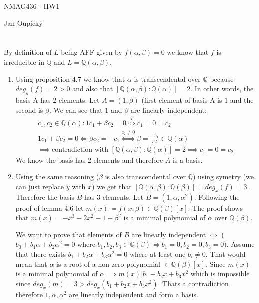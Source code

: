 \documentclass[12pt, a4paper]{article}
\begin{document}
\begin{center}
\large NMAG436 - HW1

\normalsize Jan Oupický
\end{center}
\vspace{1\baselineskip}

\section{}
By definition of $L$ being AFF given by $f(\alpha,\beta) = 0$ we know that $f$ is irreducible in $\mathbb{Q}$ and $L=\mathbb{Q}(\alpha,\beta)$.
\begin{enumerate}[label=(\alph*)]
\item Using proposition 4.7 we know that $\alpha$ is transcendental over $\mathbb{Q}$ because $deg_y(f)=2>0$ and also that $[\mathbb{Q}(\alpha,\beta):\mathbb{Q}(\alpha)]=2$. In other words, the basis A has 2 elements. Let $A=(1, \beta)$ (first element of basis A is $1$ and the second is $\beta$. We can see that $1$ and $\beta$ are linearly independent: 
\begin{gather*}
c_1,c_2 \in \mathbb{Q}(\alpha) :1c_1+\beta c_2 = 0 \stackrel{?}{\iff} c_1 = 0 = c_2\\
1c_1+\beta c_2 = 0 \iff \beta c_2 = -c_1 \stackrel{c_2 \neq 0}{\iff} \beta = \frac{-c_1}{c2} \in \mathbb{Q}(\alpha)\\
\implies \text{contradiction with }[\mathbb{Q}(\alpha,\beta):\mathbb{Q}(\alpha)]=2 \implies c_1 = 0 = c_2
\end{gather*}
We know the basis has 2 elements and therefore $A$ is a basis.
\item Using the same reasoning ($\beta$ is also transcendental over $\mathbb{Q}$) using symetry (we can just replace $y$ with $x$) we get that $[\mathbb{Q}(\alpha,\beta):\mathbb{Q}(\beta)]=deg_x(f)=3$. Therefore the basis $B$ has 3 elements. Let $B = (1, \alpha, \alpha^2)$. Following the proof of lemma 4.6 let $m(x) \coloneqq f(x, \beta) \in \mathbb{Q}(\beta)[x]$. The proof shows that $m(x) = -x^3-2x^2-1+\beta^2$ is a minimal polynomial of $\alpha$ over $\mathbb{Q}(\beta)$. 

We want to prove that elements of $B$ are linearly independent $\iff$ ($b_0+b_1\alpha + b_2\alpha^2 = 0$ where $b_1,b_2,b_3 \in \mathbb{Q}(\beta) \iff b_1 = 0, b_2 = 0, b_3 = 0)$. Assume that there exists $b_1 + b_2\alpha + b_3\alpha^2 = 0$ where at least one $b_i \neq 0$. That would mean that $\alpha$ is a root of a non zero polynomial $\in \mathbb{Q}(\beta)[x]$. Since $m(x)$ is a minimal polynomial of $\alpha \implies m(x) | b_1+b_2x+b_3x^2$  which is impossible since $deg_x(m) = 3 > deg_x(b_1+b_2x+b_3x^2)$. Thats a contradiction therefore $1,\alpha, \alpha^2$ are linearly independent and form a basis.


\end{enumerate}
\end{document}
